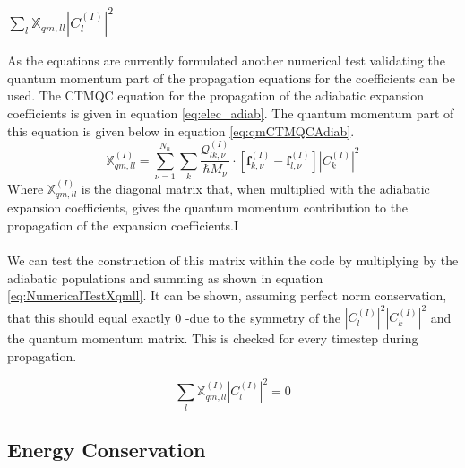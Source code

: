 \subsubsection{$\sum_{l} \mathbb{X}_{qm, ll} |C_{l}^{(I)}|^2$}
\label{sect:sumXqmll}
As the equations are currently formulated another numerical test validating the quantum momentum part of the propagation equations for the coefficients can be used. The CTMQC equation for the propagation of the adiabatic expansion coefficients is given in equation \eqref{eq:elec_adiab}. The quantum momentum part of this equation is given below in equation \eqref{eq:qmCTMQCAdiab}. 
\begin{equation}
  \mathbb{X}_{qm, ll}^{(I)} = \sum_{\nu=1}^{N_n}\sum_{k} \frac{\mathcal{Q}_{lk, \nu}^{(I)}}{\hbar     M_\nu} \cdot \left[ \mathbf{f}_{k,\nu}^{(I)} - \mathbf{f}_{l,\nu}^{(I)}   \right] |C_{k}^{(I)}|^2
  \label{eq:qmCTMQCAdiab}
\end{equation}
Where $\mathbb{X}_{qm, ll}^{(I)}$ is the diagonal matrix that, when multiplied with the adiabatic expansion coefficients, gives the quantum momentum contribution to the propagation of the expansion coefficients.I
\\\\
We can test the construction of this matrix within the code by multiplying by the adiabatic populations and summing as shown in equation \eqref{eq:NumericalTestXqmll}. It can be shown, assuming perfect norm conservation, that this should equal exactly 0 -due to the symmetry of the $|C_{l}^{(I)}|^2|C_{k}^{(I)}|^2$ and the quantum momentum matrix. This is checked for every timestep during propagation.

\begin{equation}
  \sum_{l} \mathbb{X}_{qm, ll}^{(I)} |C_{l}^{(I)}|^2 = 0
  \label{eq:NumericalTestXqmll}
\end{equation}


\subsection{Energy Conservation}
